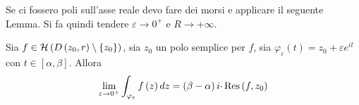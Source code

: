 Se ci fossero poli sull'asse reale devo fare dei morsi e applicare il seguente Lemma. Si fa quindi tendere $\varepsilon \rightarrow 0^{+}$ e $R\rightarrow +\infty $.
\begin{thm}
 Sia $f\in \Hc \left( D\left( z_{0} ,r\right) \setminus \left\{z_{0}\right\}\right)$, sia $z_{0}$ un polo semplice per $f$, sia $\varphi _{\varepsilon }\left( t\right) =z_{0} +\varepsilon e^{it}$ con $t\in \left[ \alpha ,\beta \right]$. Allora
\begin{equation*}
\lim _{\varepsilon \rightarrow 0^{+}}\int _{\varphi _{\varepsilon }} f\left( z\right) dz=\left( \beta -\alpha \right) i\cdotp \Res \left( f,z_{0}\right)
\end{equation*}
\end{thm}
\begin{figure}[htpb]
	\centering
{} %

\begin{tikzpicture}[x=0.75pt,y=0.75pt,yscale=-1,xscale=1]


\end{tikzpicture}
\end{figure}
